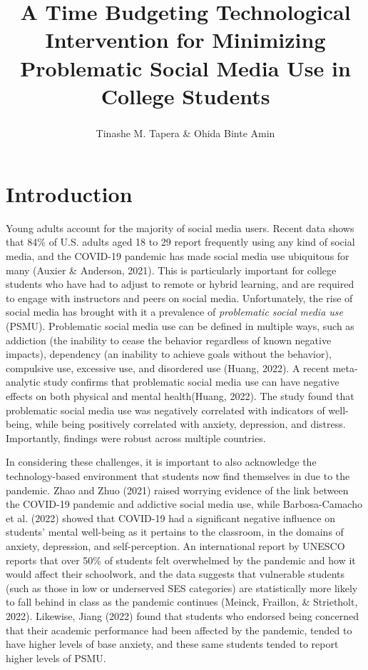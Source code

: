 \documentclass[
  man]{apa6}
\title{A Time Budgeting Technological Intervention for Minimizing Problematic Social Media Use in College Students}
\author{Tinashe M. Tapera\textsuperscript{} \& Ohida Binte Amin\textsuperscript{}}
\date{}
\affiliation{\phantom{0}}
\begin{document}
\maketitle

\hypertarget{introduction}{%
\section{Introduction}\label{introduction}}

Young adults account for the majority of social media users. Recent data shows
that 84\% of U.S. adults aged 18 to 29 report frequently using any kind of
social media, and the COVID-19 pandemic has made social media use ubiquitous
for many (Auxier \& Anderson, 2021). This is particularly important for college
students who have had to adjust to remote or hybrid learning, and are required
to engage with instructors and peers on social media. Unfortunately, the rise
of social media has brought with it a prevalence of \emph{problematic social media use}
(PSMU). Problematic social media use can be defined in multiple ways, such as
addiction (the inability to cease the behavior regardless of known negative
impacts), dependency (an inability to achieve goals without the behavior),
compulsive use, excessive use, and disordered
use (Huang, 2022). A recent meta-analytic study confirms that
problematic social media use can have negative effects on both
physical and mental health(Huang, 2022).
The study found that problematic social media use was negatively correlated
with indicators of well-being, while being positively correlated with anxiety,
depression, and distress. Importantly, findings were robust across multiple countries.

In considering these challenges, it is important to also acknowledge the
technology-based environment that students now find themselves in due to the
pandemic. Zhao and Zhuo (2021) raised worrying
evidence of the link between the COVID-19 pandemic and addictive social media
use, while Barbosa-Camacho et al. (2022) showed that COVID-19
had a significant negative influence on students' mental well-being as it
pertains to the classroom, in the domains of anxiety, depression, and
self-perception. An international report by UNESCO reports that over 50\% of
students felt overwhelmed by the pandemic and how it would affect their
schoolwork, and the data suggests that vulnerable students (such as those in
low or underserved SES categories) are statistically more likely to fall behind
in class as the pandemic continues (Meinck, Fraillon, \& Strietholt, 2022).
Likewise, Jiang (2022) found that students who
endorsed being concerned that their academic performance had been affected
by the pandemic, tended to have higher levels of base anxiety, and these
same students tended to report higher levels of PSMU.
\end{document}
